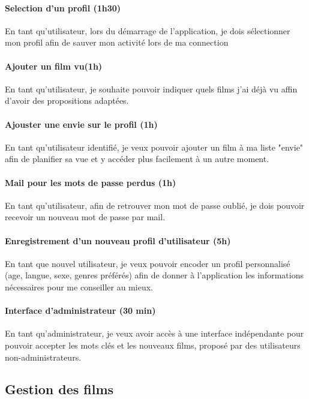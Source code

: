 \documentclass[a4paper,12pt]{article}
\begin{document}
\paragraph{Selection d'un profil (1h30)}
En tant qu'utilisateur, lors du démarrage de l'application, je dois sélectionner mon profil afin de sauver mon activité lors de ma connection

\paragraph{Ajouter un film vu(1h)}
En tant qu'utilisateur, je souhaite pouvoir indiquer quels films j'ai déjà vu affin d'avoir des propositions adaptées.

\paragraph{Ajouster une envie sur le profil (1h)}
En tant qu'utilisateur identifié, je veux pouvoir ajouter un film à ma liste "envie" afin de planifier sa vue et y accéder plus facilement à un autre moment.

\paragraph{Mail pour les mots de passe perdus (1h)}
En tant qu'utilisateur, afin de retrouver mon mot de passe oublié, je dois pouvoir recevoir un nouveau mot de passe par mail.

\paragraph{Enregistrement d'un nouveau profil d'utilisateur (5h)}
En tant que nouvel utilisateur, je veux pouvoir encoder un profil personnalisé (age, langue, sexe, genres préférés) afin de donner à l'application les informations nécessaires pour me conseiller au mieux.

\paragraph{Interface d'administrateur (30 min)}
En tant qu'administrateur, je veux avoir accès à une interface indépendante pour pouvoir accepter les mots clés et les nouveaux films, proposé par des utilisateurs non-administrateurs.

\subsection{Gestion des films}
\end{document}
